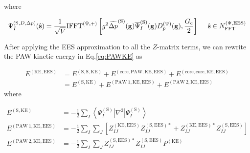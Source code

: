 \documentclass[paper=a4, fontsize=11pt]{article} %
\numberwithin{equation}{section} %
\numberwithin{figure}{section} %
\numberwithin{table}{section} %
\newcommand{\wt}{\widetilde}
\newcommand{\bg}{{\bf{g}}}
\newcommand{\hs}{{\hat{\bf{s}}}}
\newcommand{\rS}{{\mathrm{S}}}
\newcommand{\rKE}{{\mathrm{KE}}}
\newcommand{\rEES}{{\mathrm{EES}}}
\newcommand{\rcore}{{\mathrm{core}}}
\newcommand{\rP}{{\mathrm{PAW}}}
\newcommand{\psigs}{{\overline \Psi_I^{(\rS)}(\bg)}}
\newcommand{\NFFTpEES}{{N^{\mathrm{(\Psi,\rEES})}_{\mathrm{FFT}}}}
\newcommand{\hGc}{{\frac{G_{\mathrm{c}}}{2}}}
\newcommand{\Dpg}{{D^{(\Psi)}_p(\bg)}}
\newcommand{\IFFTp}{{\mathrm{IFFT}^{(\Psi,+)}}}
\newcommand{\hsinpEES}{{\ \ \ \ \hs \in \NFFTpEES}}
\begin{document}
where

\begin{equation}
\begin{split}
\Psi_I^{(\rS,D,\Delta p)}(\hs)
&= \frac{1}{\sqrt{V}}\IFFTp \left[ g^2  \wt {\Delta p}^{(\rS)}(\bg)\psigs \Dpg,\hGc\right]\hsinpEES \\
\end{split}
\end{equation}

After applying the EES approximation to all the $Z$-matrix terms, we can rewrite the PAW kinetic energy in Eq.\eqref{eq:PAWKE} as

\begin{equation} \label{eq:PAWKEEES}
\begin{split}
E^{(\rKE,\rEES)}
&=E^{(\rS,\rS,\rKE)}+ E^{(\rcore,\rP,\rKE,\rEES)} + E^{(\rcore,\rcore,\rKE,\rEES)}\\ 
&=E^{(\rS,\rKE)}+ E^{(\rP\ 1,\rKE,\rEES)} + E^{(\rP\ 2,\rKE,\rEES)}
\end{split}
\end{equation}
where

\begin{equation}
\begin{split}
E^{(\rS,\rKE)}
& = -\frac{1}{2}\sum_I \left<\Psi_I^{(\rS)}|\nabla^2|\Psi_I^{(\rS)}\right> \\
E^{(\rP\ 1,\rKE,\rEES)}
&= -\frac{1}{2}\sum_I \sum_J \left[Z_{IJ}^{(\rKE,\rEES)}Z_{IJ}^{(\rS,\rEES)*} + Z_{IJ}^{(\rKE,\rEES)*}Z_{IJ}^{(\rS,\rEES)} \right]\\
E^{(\rP\ 2,\rKE,\rEES)}
&= -\frac{1}{2}\sum_I \sum_J Z_{IJ}^{(\rS,\rEES)*}Z_{IJ}^{(\rS,\rEES)}P^{(\rKE)}\\
\end{split}
\end{equation}
\end{document}
